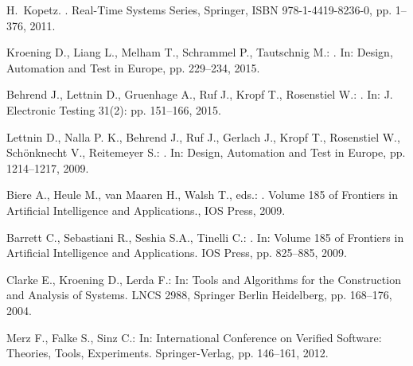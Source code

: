 \documentclass{acm_sen_article}
\begin{document}





\begin{thebibliography}{1}

H.~Kopetz.
.
\newblock Real-Time Systems Series, Springer, ISBN 978-1-4419-8236-0, pp. 1--376, 2011.

Kroening D., Liang L., Melham T., Schrammel P., Tautschnig M.:
. 
\newblock In: Design, Automation and Test in Europe, pp. 229--234, 2015.

Behrend J., Lettnin D., Gruenhage A., Ruf J., Kropf T., Rosenstiel W.:
. 
\newblock In: J. Electronic Testing 31(2): pp. 151--166, 2015.

Lettnin D., Nalla P. K., Behrend J., Ruf J., Gerlach J., Kropf T., Rosenstiel W., Schönknecht V., Reitemeyer S.:
. 
\newblock In: Design, Automation and Test in Europe, pp. 1214--1217, 2009.

Biere A., Heule M., van Maaren H., Walsh T., eds.:
.
\newblock Volume 185 of Frontiers in Artificial Intelligence and Applications., {IOS} Press, 2009.


Barrett C., Sebastiani R., Seshia S.A., Tinelli C.:
. 
\newblock In: Volume 185 of Frontiers in Artificial Intelligence and Applications. IOS Press, pp. 825--885, 2009.

Clarke E., Kroening D., Lerda F.:
\newblock In: Tools and Algorithms for the Construction and Analysis of Systems. LNCS 2988, Springer Berlin Heidelberg,  pp. 168--176, 2004.

Merz F., Falke S., Sinz C.:
\newblock In: International Conference on Verified Software: Theories, Tools, Experiments. Springer-Verlag, pp. 146--161, 2012.


\end{thebibliography}
\end{document}
